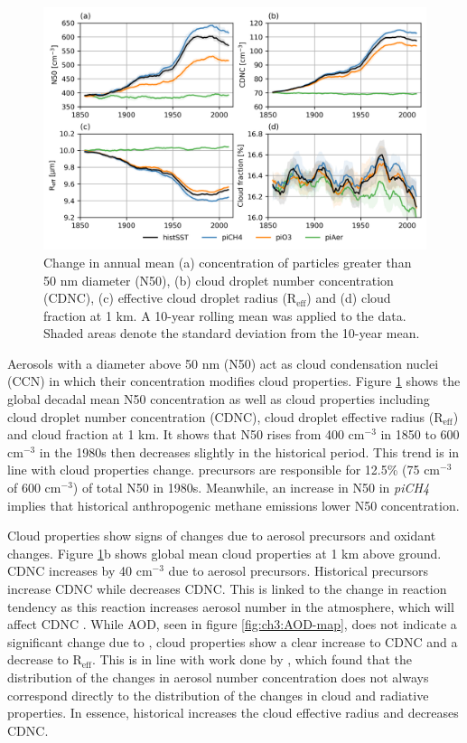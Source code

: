 \begin{figure}
    \centering
    \includegraphics[width=\linewidth]{Chapter3/Figs/f09_cloud-props.png}
    \caption{Change in annual mean (a) concentration of particles greater than 50 nm diameter (N50), (b) cloud droplet number concentration (CDNC), (c) effective cloud droplet radius (R$_{\textrm{eff}}$) and (d) cloud fraction at 1 km. A 10-year rolling mean was applied to the data. Shaded areas denote the standard deviation from the 10-year mean.}
    \label{fig:ch3:cloud}
\end{figure}

Aerosols with a diameter above 50 nm (N50) act as cloud condensation nuclei (CCN) in which their concentration modifies cloud properties. Figure \ref{fig:ch3:cloud} shows the global decadal mean N50 concentration as well as cloud properties including cloud droplet number concentration (CDNC), cloud droplet effective radius (R$_{\textrm{eff}}$) and cloud fraction at 1 km. It shows that N50 rises from 400 cm$^{-3}$ in 1850 to 600 cm$^{-3}$ in the 1980s then decreases slightly in the historical period. This trend is in line with cloud properties change.  precursors are responsible for 12.5\% (75 cm$^{-3}$  of 600 cm$^{-3}$) of total N50 in 1980s. Meanwhile, an increase in N50 in \textit{piCH4} implies that historical anthropogenic methane emissions lower N50 concentration.

Cloud properties show signs of changes due to aerosol precursors and oxidant changes. Figure \ref{fig:ch3:cloud}b shows global mean cloud properties at 1 km above ground. CDNC increases by 40 cm$^{-3}$ due to aerosol precursors. Historical  precursors increase CDNC while  decreases CDNC. This is linked to the change in  reaction tendency as this reaction increases aerosol number in the atmosphere, which will affect CDNC \citep{twomeyInfluencePollutionShortwave1977}. While AOD, seen in figure \ref{fig:ch3:AOD-map}, does not indicate a significant change due to , cloud properties show a clear increase to CDNC and a decrease to R$_{\textrm{eff}}$. This is in line with work done by \citet{karsetStrongImpactsAerosol2018}, which found that the distribution of the changes in aerosol number concentration does not always correspond directly to the distribution of the changes in cloud and radiative properties. In essence, historical  increases the cloud effective radius and decreases CDNC.

